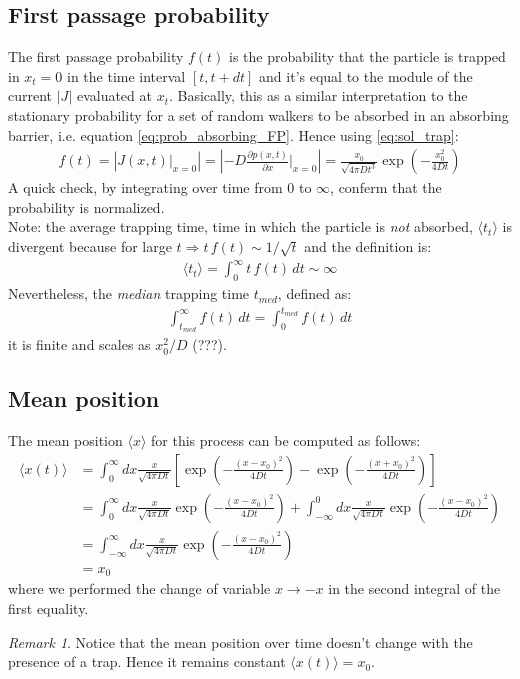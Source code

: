 \documentclass[4apaper,11pt,fleqn]{article}
\theoremstyle{remark}
\newtheorem*{rem}{Remark}
\theoremstyle{definition}
\begin{document}
\subsection{First passage probability}
The first passage probability $f(t)$ is the probability that the particle is trapped in $x_t=0$ in the time interval $[t,t+dt]$ and it's equal to the module of the current $|J|$ evaluated at $x_t$.
Basically, this as a similar interpretation to the stationary probability for a set of random walkers to be absorbed in an absorbing barrier, i.e. equation \eqref{eq:prob_absorbing_FP}.
Hence using \eqref{eq:sol_trap}:
\begin{align*}
  f (t) = \left|  J(x,t) \Bigr|_{x=0} \right| = \left|  -D \frac{\partial p(x,t)}{\partial x}\Bigr|_{x=0} \right| = \frac{x_{0}}{\sqrt{4 \pi D t^{3}}} \exp \left(-\frac{x_{0}^{2}}{4 D t}\right)
\end{align*}
A quick check, by integrating over time from 0 to $\infty$, conferm that the probability is normalized. \\
Note: the average trapping time, time in which the particle is \emph{not} absorbed, $\langle t_t \rangle$ is divergent because for large $t \Rightarrow t\,f(t) \sim 1/\sqrt{t}$ and the definition is:
\begin{align*}
  \langle t_t \rangle = \int_0^\infty t \, f(t) \, dt \sim \infty
\end{align*}
Nevertheless,  the \emph{median} trapping time $t_{med}$, defined as:
\begin{align*}
  \int_{t_{med}}^\infty f(t)\, dt = \int_0^{t_{med}} f(t) \, dt
\end{align*}
it is finite and scales as $x_0^2/D$ (???).

\subsection{Mean position}
\label{subsec:mean_pos}
The mean position $\langle x \rangle$ for this process can be computed as follows:
\begin{align*}
  \langle x(t)\rangle &= \int_{0}^{\infty} d x \frac{x}{\sqrt{4 \pi D t}}\left[\exp \left(-\frac{\left(x-x_{0}\right)^{2}}{4 D t}\right)-\exp \left(-\frac{\left(x+x_{0}\right)^{2}}{4 D t}\right)\right] \\
                      &= \int_{0}^{\infty} d x \frac{x}{\sqrt{4 \pi D t}} \exp \left(-\frac{\left(x-x_{0}\right)^{2}}{4 D t}\right)+\int_{-\infty}^{0} d x \frac{x}{\sqrt{4 \pi D t}} \exp \left(-\frac{\left(x-x_{0}\right)^{2}}{4 D t}\right) \\
                      &= \int_{-\infty}^{\infty} d x \frac{x}{\sqrt{4 \pi D t}} \exp \left(-\frac{\left(x-x_{0}\right)^{2}}{4 D t}\right) \\
                      &= x_0
\end{align*}
where we performed the change of variable $x \rightarrow -x$ in the second integral of the first equality.
\begin{rem}
  Notice that the mean position over time doesn't change with the presence of a trap. Hence it remains constant $\boxed{\langle x(t)\rangle = x_0}$.
\end{rem}
\end{document}
